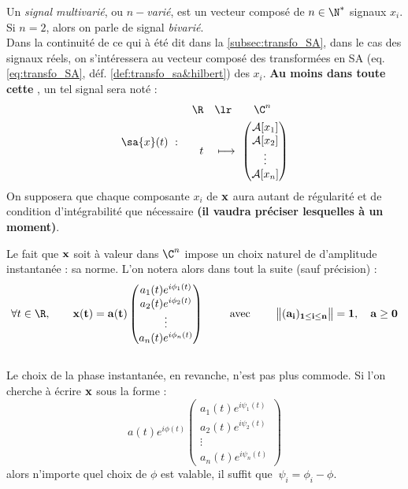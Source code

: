 \begin{definition}\label{def:signal_multivar}
	Un \emph{signal multivarié}, ou \emph{$n-$varié}, est un vecteur composé de $n\in\N^*$ signaux $x_i$. Si $n=2$, alors on parle de signal \emph{bivarié}.
	\\
	Dans la continuité de ce qui à été dit dans la \cref{subsec:transfo_SA}, dans le cas des signaux réels, on s'intéressera au vecteur composé des transformées en SA (eq. \ref{eq:transfo_SA}, déf. \ref{def:transfo_sa&hilbert}) des $x_i$.
	\textbf{Au moins dans toute cette }, un tel signal sera noté :
	\[\sa{x}(t)\ :\quad \begin{aligned} 
		\R\quad &\lr\qquad \C^n \\t\quad &\longmapsto\ \begin{pmatrix} \mathcal{A}[x_1] \\ 
			\mathcal{A}[x_2] \\ \vdots \\ \mathcal{A}[x_n] \end{pmatrix}
	\end{aligned} \]
	On supposera que chaque composante $x_i$ de $\bf{x}$ aura autant de régularité et de condition d'intégrabilité que nécessaire \textbf{(il vaudra préciser lesquelles à un moment)}.
\end{definition}

Le fait que $\bf{x}$ soit à valeur dans $\C^n$ impose un choix naturel de d'amplitude instantanée : sa norme. L'on notera alors dans tout la suite (sauf précision) :
\[\forall t\in\R,\qquad 
	\bf{x}(t) = a(t)\begin{pmatrix} a_1(t)e^{i\phi_1(t)} \\ a_2(t)e^{i\phi_2(t)} \\ \vdots \\ a_n(t)e^{i\phi_n(t)}
\end{pmatrix} \qquad\text{ avec }\qquad \big\|(a_i)_{1\leq i\leq n}\big\|=1,\quad a\geq 0
\]
\\
Le choix de la phase instantanée, en revanche, n'est pas plus commode. Si l'on cherche à écrire $\bf{x}$ sous la forme :
\[a(t)e^{i\phi(t)}\begin{pmatrix} a_1(t)e^{i\psi_1(t)} \\ a_2(t)e^{i\psi_2(t)} \\ \vdots \\ a_n(t)e^{i\psi_n(t)}
\end{pmatrix}\]
alors n'importe quel choix de $\phi$ est valable, il suffit que $\ \psi_i = \phi_i-\phi$.




